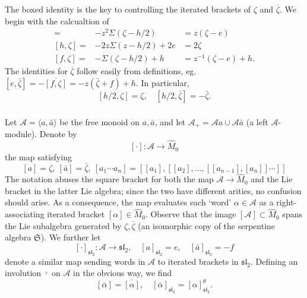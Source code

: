 \documentclass{article}
\def\fsl{\mathfrak{sl}}
\def\fS{\mathfrak{S}}
\def\sA{\mathcal{A}}
\theoremstyle{definition}
\begin{document}
\subsubsection{}
The boxed identity is the key to controlling the
iterated brackets of $\zeta$ and $\overline\zeta$.
We begin with the calcualtion of 
\begin{eqnarray*}
        [e,\zeta] =& -z^2\Sigma(\zeta-h/2) &= z(\zeta - e) \\ {}
        [h,\zeta] =& -2z\Sigma(z-h/2) +2e &= 2\zeta \\ {}
        [f,\zeta] =& -\Sigma(\zeta-h/2) + h &= z^{-1}(\zeta - e) + h.
\end{eqnarray*}
The identities for $\overline\zeta$ follow easily from definitions, eg.
$[e,\bar\zeta] = -\overline{[f,\zeta]} = -z(\bar\zeta + f) + h$.
In particular,
$$
[h/2,\zeta] = \zeta,\quad [h/2,\bar\zeta]=-\bar\zeta.
$$

\subsubsection{}
Let $\sA = \langle a,\bar a\rangle$
be the free monoid on $a,\bar a$, and let
$\sA_+ = \sA a \cup \sA \bar a$ (a left $\sA$-module).
Denote by
$$ [\cdot] : \sA \to \hat M_0 $$
the map satisfying
$$ [a]=\zeta,\ [\bar a] =\bar\zeta,\ [a_1\cdots a_n] = [[a_1], [[a_2], \dots, [[a_{n-1}],[a_n]]\cdots]] $$
The notation abuses the square bracket for both the map $\sA \to \hat M_0$ and
the Lie bracket in the latter Lie algebra; since the two have different arities, no confusion should arise.
As a consequence, the map evaluates each `word' $\alpha \in \sA$ as a right-associating iterated bracket
$[\alpha] \in \hat M_0$. Observe that the image $[\sA] \subset \hat M_0$ spans
the Lie subalgebra generated by $\zeta,\bar\zeta$ (an isomorphic copy of the serpentine
algebra $\fS$).
We further let $$[\cdot]_{\fsl_2} : \sA \to \fsl_2,\quad [a]_{\fsl_2} = e,\quad [\bar a]_{\fsl_2} = -f $$
denote a similar map sending words in $\sA$ to iterated brackets in $\fsl_2$.
Defining an involution $\bar\cdot$ on $\sA$
in the obvious way, we find
$$[\bar\alpha] = \overline{[\alpha]},\quad [\bar\alpha]_{\fsl_2} = [\alpha]_{\fsl_2}^\theta. $$
\end{document}
